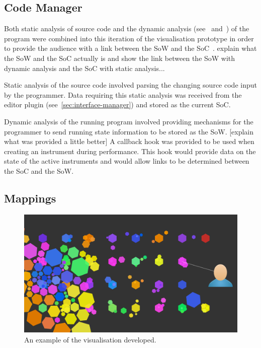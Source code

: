 \subsection{Code Manager}

Both static analysis of source code and the dynamic analysis (see~\cite{Eisenbarth2003} and~\cite{Jerding1997}) of the program were combined into this iteration of the visualisation prototype in order to provide the audience with a link between the \ac{SoW} and the \ac{SoC}~\cite{Swift2013}. {\color{red} explain what the \ac{SoW} and the \ac{SoC} actually is and show the link between the \ac{SoW} with dynamic analysis and the \ac{SoC} with static analysis...}

Static analysis of the source code involved parsing the changing source code input by the programmer. Data requiring this static analysis was received from the editor plugin (see~\ref{sec:interface-manager}) and stored as the current \ac{SoC}.

Dynamic analysis of the running program involved providing mechanisms for the programmer to send running state information to be stored as the \ac{SoW}. {\color{red} [explain what was provided a little better]} A callback hook was provided to be used when creating an instrument during performance. This hook would provide data on the state of the active instruments and would allow links to be determined between the \ac{SoC} and the \ac{SoW}.

\subsection{Mappings}

\begin{figure}
\centering
\includegraphics[width=\textwidth]{../images/final-visualisations/final-code-visualisation.png}
\caption[Prototype (second iteration) example]{An example of the visualisation developed.}
\label{fig:final-visualisation}
\end{figure}

